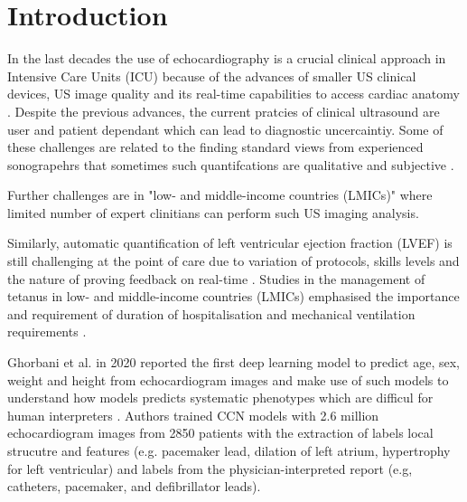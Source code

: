 \section{Introduction} \label{sec:intro}
In the last decades the use of echocardiography is a crucial clinical approach in Intensive Care Units (ICU) because of the advances of smaller US clinical devices, US image quality and its real-time capabilities to access cardiac anatomy \cite{Feigenbaum1996, Vieillard-Baron2008, singh2007, cambell2018}.
Despite the previous advances, the current pratcies of clinical ultrasound are user and patient dependant which can lead to diagnostic uncercaintiy.
Some of these challenges are related to the finding standard views from experienced sonograpehrs that sometimes such quantifcations are qualitative and subjective \cite{Feigenbaum1996}.

Further challenges are in "low- and middle-income countries (LMICs)" where limited number of expert clinitians can perform such US imaging analysis.

Similarly, automatic quantification of left ventricular ejection fraction (LVEF) is still challenging at the point of care due to variation of protocols, skills levels \cite{field2011} and the nature of proving feedback on real-time \cite{liu2021}.
Studies in the management of tetanus in low- and middle-income countries (LMICs) emphasised the importance and requirement of duration of hospitalisation and mechanical ventilation requirements \cite{hao2021-wellcome}.

Ghorbani et al. in 2020 reported the first deep learning model to predict age, sex, weight and height from echocardiogram images and make use of such models to understand how models predicts systematic phenotypes which are difficul for human interpreters \cite{Ghorbani-DigitalMedicineNature-JAN2020}.
Authors trained CCN models with 2.6 million echocardiogram images from 2850 patients with the extraction of labels local strucutre and features (e.g. pacemaker lead, dilation of left atrium, hypertrophy for left ventricular) and labels from the physician-interpreted report (e.g, catheters, pacemaker, and deﬁbrillator leads). 



